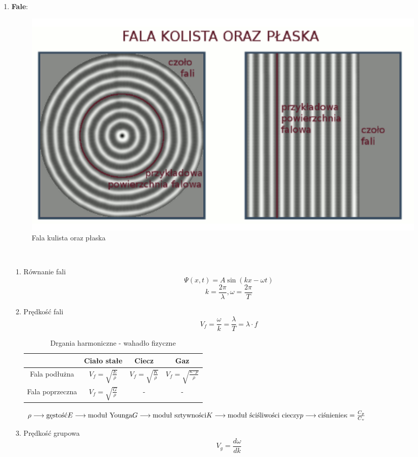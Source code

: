 \documentclass{article}
\begin{document}
\begin{enumerate}
		
		
		\item \textbf{Fale}:
		\begin{figure}[h]
			\centering
			\includegraphics[width=0.5 \textwidth]{fale.png}
			\caption{Fala kulista oraz płaska}
			\label{fig:fale}
		\end{figure}
		\\
		\begin{enumerate}
			\item Równanie fali
			\[
			\varPsi(x, t) = A \sin (kx - \omega t)
			\]
			\[
			k = \frac{2 \pi}{\lambda}, \omega = \frac{2 \pi}{T}
			\]
			\item Prędkość fali
			\[
			V_f = \frac{\omega}{k} = \frac{\lambda}{T} = \lambda \cdot f
			\]
			\newpage
			\begin{table}[h]
				\centering
				\caption{Drgania harmoniczne - wahadło fizyczne}
				\label{tab:Fale w ośrodkach sprężystych}
				\begin{tabular}{|c|c|c|c|}
					\hline
					& \textbf{Ciało stałe} & \textbf{Ciecz} & \textbf{Gaz} \\
					\hline
					Fala podłużna & $V_f = \sqrt{\frac{E}{\rho}}$ & $V_f = \sqrt{\frac{K}{\rho}}$ & $V_f = \sqrt{\frac{\kappa \cdot p}{\rho}}$ \\
					\hline
					Fala poprzeczna & $V_f = \sqrt{\frac{G}{\rho}}$ & - & - \\
					\hline
				\end{tabular}
			\end{table}
			$
			\rho \longrightarrow \text{gęstość} \\
			E \longrightarrow \text{moduł Younga} \\
			G \longrightarrow \text{moduł sztywności} \\
			K \longrightarrow \text{moduł ściśliwości cieczy} \\
			p \longrightarrow \text{ciśnienie} \\
			\kappa = \frac{C_p}{C_v} \\ \\
			$
			\item Prędkość grupowa
			\[
			V_g = \frac{d \omega}{dk}
\]
\end{enumerate}
\end{enumerate}
\end{document}
